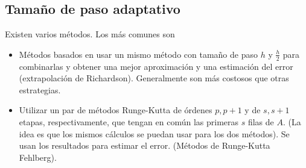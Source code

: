 \documentclass[11pt,letterpaper]{report}
\begin{document}
\subsection{Tamaño de paso adaptativo}

Existen varios métodos. Los más comunes son
\begin{itemize}
  \item
    Métodos basados en usar un mismo método con tamaño de paso $h$ y
    $\frac{h}{2}$ para combinarlas y obtener una mejor aproximación y
    una estimación del error (extrapolación de Richardson).
    Generalmente son más costosos que otras estrategias.
  \item
    Utilizar un par de métodos Runge-Kutta de órdenes $p,p+1$ y de
    $s,s+1$ etapas, respectivamente, que tengan en común las primeras
    $s$ filas de $A$. (La idea es que los mismos cálculos se puedan
    usar para los dos métodos). Se usan los resultados para estimar el
    error. (Métodos de Runge-Kutta Fehlberg).
\end{itemize}
\end{document}
